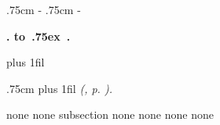 \begingroup
\newcommand*{\DotsAndPage}
{\nobreak\leaders\hbox{\bfseries\normalsize\hbox to .75ex {\hss.\hss}}%
         \hfill\nobreak
         \makebox[\rightskip][r]{\bfseries\normalsize\etocpage}\par}

{\parindent 0pt
 \nobreak
 \etocskipfirstprefix}
{\pagebreak[3]\bigskip}
{\large\rmfamily\bfseries\centering %
 \etocname\par}
{}

{\leftskip 0pt \rightskip .75cm \parfillskip-\rightskip
 \nobreak\medskip
 \etocskipfirstprefix}
{\leftskip 0pt \rightskip .75cm \parfillskip-\rightskip
 \pagebreak[1]\smallskip}
{\normalsize\rmfamily\bfseries %
 \etocnumber. \etocname\DotsAndPage }
{\parfillskip 0pt plus 1fil\relax }

{\rightskip .75cm \parfillskip 0pt plus 1fil\relax
 \nobreak\smallskip}
{}
{\footnotesize\sffamily\mdseries\itshape
 \etocname{} (\etocnumber, p. \etocpage). }
{\par\medskip}

   {none}
   {none}
    {subsection}
    {none}
   {none}
   {none}
       {none}

\etocsettocstyle {\centering\LARGE\textsc{\contentsname}\par\nobreak\medskip}{}
\etocobeydepthtags %
\tableofcontents
\endgroup
